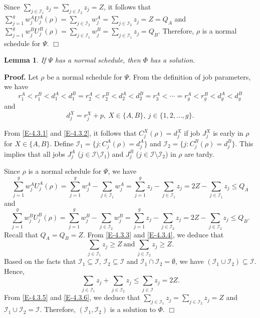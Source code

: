 \documentclass[12pt]{article}
\newtheorem{lemma}{Lemma}[section]
\begin{document}
\begin{sloppypar}
Since $\sum_{j \in \mathcal{I}_1} z_j= \sum_{j \in \mathcal{I}_2} z_j=Z$, it follows that 
$\sum_{j=1}^g w_j^A U_j^A(\rho)=\sum_{j \in \mathcal{I}_2} w_j^A =\sum_{j \in \mathcal{I}_2} z_j=Z=Q_A$
and $\sum_{j=1}^g w_j^B U_j^B(\rho)=\sum_{j \in \mathcal{I}_1} w_j^B =\sum_{j \in \mathcal{I}_1} z_j=Q_B$.
Therefore, $\rho$ is a normal schedule for $\Psi$. \hfill$\Box$

\begin{lemma} \label{L-4.3.2}
If $\Psi$ has a normal schedule, then $\Phi$ has a solution.
\end{lemma}
\noindent \textbf{Proof.} Let $\rho$ be a normal schedule for $\Psi$.
From the definition of job parameters, we have
\begin{equation}\label{E-4.3.1}
r_1^A <r_1^B<d_1^A<d_1^B=r_2^A < r_2^B <d_2^A<d_2^B=r_3^A< \cdots =r_g^A <r_g^B<d_g^A<d_g^B
\end{equation}
and
\begin{equation}\label{E-4.3.2}
d_j^X=r_j^X+p, ~ X \in \{A, B\}, ~ j \in \{1, 2, \ldots, g\}.
\end{equation}

From \eqref{E-4.3.1} and \eqref{E-4.3.2}, it follows that $C_j^X(\rho)=d_j^X$ if job $J_j^X$ is 
early in $\rho$ for $X \in \{A, B\}$. Define $\mathcal{I}_1=\{j: C_j^A(\rho)=d_j^A\}$
and $\mathcal{I}_2=\{j: C_j^B(\rho)=d_j^B\}$. This implies that all jobs $J_j^A$ ($j \in \mathcal{I} \setminus \mathcal{I}_1$) and $J_j^B$ ($j \in \mathcal{I} \setminus \mathcal{I}_2$) in $\rho$ are tardy.

Since $\rho$ is a normal schedule for $\Psi$, we have
\begin{equation} \label{E-4.3.3}
\sum_{j=1}^g w_j^A U_j^A(\rho)=\sum_{j=1}^g w_j^A-\sum_{j \in \mathcal{I}_1} w_j^A
=\sum_{j=1}^g z_j-\sum_{j \in \mathcal{I}_1} z_j =2Z-\sum_{j \in \mathcal{I}_1} z_j\leq Q_A
\end{equation}
and
\begin{equation}\label{E-4.3.4}
\sum_{j=1}^g w_j^B U_j^B(\rho)=\sum_{j=1}^g w_j^B-\sum_{j \in \mathcal{I}_2} w_j^B
=\sum_{j=1}^g z_j-\sum_{j \in \mathcal{I}_2} z_j =2Z-\sum_{j \in \mathcal{I}_2} z_j\leq Q_B.
\end{equation}
Recall that $Q_A=Q_B=Z$. From \eqref{E-4.3.3} and \eqref{E-4.3.4}, we deduce that
\begin{equation}\label{E-4.3.5}
\sum_{j \in \mathcal{I}_1} z_j \geq Z ~\mathrm{and} ~\sum_{j \in \mathcal{I}_2} z_j \geq Z.
\end{equation}
Based on the facts that $\mathcal{I}_1 \subseteq \mathcal{I}$, $\mathcal{I}_2 \subseteq \mathcal{I}$ and
$\mathcal{I}_1 \cap \mathcal{I}_2=\emptyset$, we have $(\mathcal{I}_1\cup \mathcal{I}_2) \subseteq \mathcal{I}$. Hence, 
\begin{equation}\label{E-4.3.6}
\sum_{j \in \mathcal{I}_1}z_j +\sum_{j \in \mathcal{I}_2} z_j \leq \sum_{j \in \mathcal{I}} z_j =2Z.
\end{equation}
From \eqref{E-4.3.5} and \eqref{E-4.3.6}, we deduce that $\sum_{j \in \mathcal{I}_1} z_j= \sum_{j \in \mathcal{I}_2} z_j=Z$
and $\mathcal{I}_1\cup \mathcal{I}_2 = \mathcal{I}$.
Therefore, $(\mathcal{I}_1, \mathcal{I}_2)$ is a solution to $\Phi$. \hfill$\Box$\\


\end{sloppypar}
\end{document}
